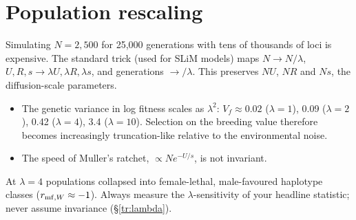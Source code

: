\section{Population rescaling}\label{sec:rescale}
Simulating $N=2{,}500$ for 25,000 generations with tens of thousands of loci is expensive. The standard trick (used for SLiM models) maps $N\to N/\lambda$, $U,R,s\to\lambda U,\lambda R,\lambda s$, and generations $\to/\lambda$. This preserves $NU$, $NR$ and $Ns$, the diffusion-scale parameters.
\begin{warnbox}
\begin{itemize}
\item The genetic variance in log fitness scales as $\lambda^2$: $V_f\approx0.02$ ($\lambda=1$), 0.09 ($\lambda=2$), 0.42 ($\lambda=4$), 3.4 ($\lambda=10$). Selection on the breeding value therefore becomes increasingly truncation-like relative to the environmental noise.
\item The speed of Muller's ratchet, $\propto N e^{-U/s}$, is not invariant.
\end{itemize}
At $\lambda=4$ populations collapsed into female-lethal, male-favoured haplotype classes ($r_{\mathrm{mf},W}\approx-1$). Always measure the $\lambda$-sensitivity of your headline statistic; never assume invariance (\S\ref{tr:lambda}).
\end{warnbox}
